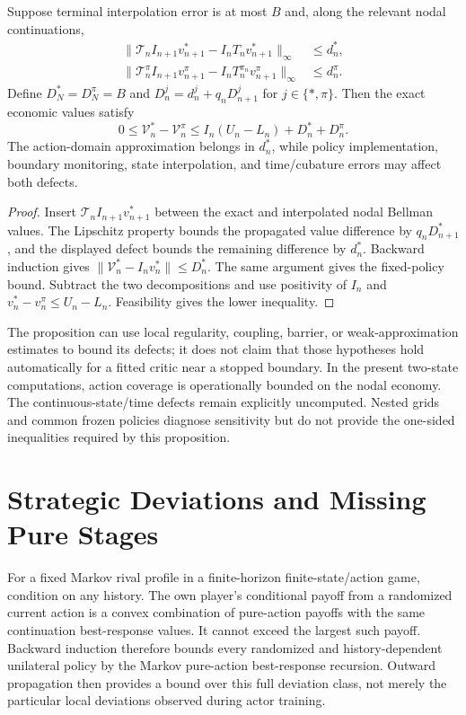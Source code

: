 \begin{proposition}
Suppose terminal interpolation error is at most $B$ and, along the relevant nodal continuations,
\begin{align*}
 \|\mathcal T_n I_{n+1}v_{n+1}^*-I_nT_nv_{n+1}^*\|_\infty&\leq d_n^*,\\
 \|\mathcal T_n^{\pi}I_{n+1}v_{n+1}^{\pi}-I_nT_n^{\pi_n}v_{n+1}^{\pi}\|_\infty&\leq d_n^{\pi}.
\end{align*}
Define $D_N^*=D_N^{\pi}=B$ and $D_n^j=d_n^j+q_nD_{n+1}^j$ for $j\in\{*,\pi\}$. Then the exact economic values satisfy
\[
 0\leq\mathcal V_n^*-\mathcal V_n^{\pi}
 \leq I_n(U_n-L_n)+D_n^*+D_n^{\pi}.
\]
The action-domain approximation belongs in $d_n^*$, while policy implementation, boundary monitoring, state interpolation, and time/cubature errors may affect both defects.
\end{proposition}
\begin{proof}
Insert $\mathcal T_n I_{n+1}v_{n+1}^*$ between the exact and interpolated nodal Bellman values. The Lipschitz property bounds the propagated value difference by $q_nD_{n+1}^*$, and the displayed defect bounds the remaining difference by $d_n^*$. Backward induction gives $\|\mathcal V_n^*-I_nv_n^*\|\leq D_n^*$. The same argument gives the fixed-policy bound. Subtract the two decompositions and use positivity of $I_n$ and $v_n^*-v_n^{\pi}\leq U_n-L_n$. Feasibility gives the lower inequality.
\end{proof}
The proposition can use local regularity, coupling, barrier, or weak-approximation estimates to bound its defects; it does not claim that those hypotheses hold automatically for a fitted critic near a stopped boundary. In the present two-state computations, action coverage is operationally bounded on the nodal economy. The continuous-state/time defects remain explicitly uncomputed. Nested grids and common frozen policies diagnose sensitivity but do not provide the one-sided inequalities required by this proposition.


\section{Strategic Deviations and Missing Pure Stages}\label{supp:r8-games}
For a fixed Markov rival profile in a finite-horizon finite-state/action game, condition on any history. The own player's conditional payoff from a randomized current action is a convex combination of pure-action payoffs with the same continuation best-response values. It cannot exceed the largest such payoff. Backward induction therefore bounds every randomized and history-dependent unilateral policy by the Markov pure-action best-response recursion. Outward propagation then provides a bound over this full deviation class, not merely the particular local deviations observed during actor training.

